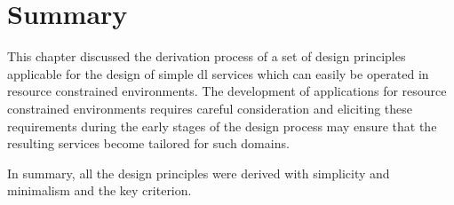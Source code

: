 \section{Summary}
\label{sec:exploratory-study:summary}

This chapter discussed the derivation process of a set of design principles
applicable for the design of simple \gls{dl} services which can easily
be operated in resource constrained environments. The development of
applications for resource constrained environments requires careful
consideration and eliciting these requirements during the early stages of the
design process may ensure that the resulting services become tailored for such
domains.

In summary, all the design principles were derived with simplicity and
minimalism and the key criterion.